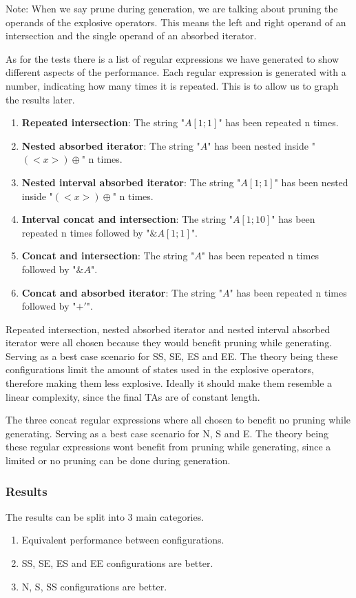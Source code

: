 Note: When we say prune during generation, we are talking about pruning the operands of the explosive operators.
This means the left and right operand of an intersection and the single operand of an absorbed iterator.

As for the tests there is a list of regular expressions we have generated to show different aspects of the performance.
Each regular expression is generated with a number, indicating how many times it is repeated.
This is to allow us to graph the results later.

\begin{enumerate}
    \item \textbf{Repeated intersection}: The string "$A[1;1]$" has been repeated n times.
    \item \textbf{Nested absorbed iterator}: The string "$A$" has been nested inside "$(<x>)\oplus$" n times.
    \item \textbf{Nested interval absorbed iterator}: The string "$A[1;1]$" has been nested inside "$(<x>)\oplus$" n times.
    \item \textbf{Interval concat and intersection}: The string "$A[1;10]$" has been repeated n times followed by "$\&A[1;1]$".
    \item \textbf{Concat and intersection}: The string "$A$" has been repeated n times followed by "$\&A$".
    \item \textbf{Concat and absorbed iterator}: The string "$A$" has been repeated n times followed by "$+'$".
\end{enumerate}

Repeated intersection, nested absorbed iterator and nested interval absorbed iterator were all chosen because they would benefit pruning while generating.
Serving as a best case scenario for SS, SE, ES and EE.
The theory being these configurations limit the amount of states used in the explosive operators, therefore making them less explosive.
Ideally it should make them resemble a linear complexity, since the final TAs are of constant length.

The three concat regular expressions where all chosen to benefit no pruning while generating.
Serving as a best case scenario for N, S and E.
The theory being these regular expressions wont benefit from pruning while generating, since a limited or no pruning can be done during generation.

\subsubsection{Results}
The results can be split into 3 main categories.

\begin{enumerate}
    \item Equivalent performance between configurations.
    \item SS, SE, ES and EE configurations are better.
    \item N, S, SS configurations are better.
\end{enumerate}